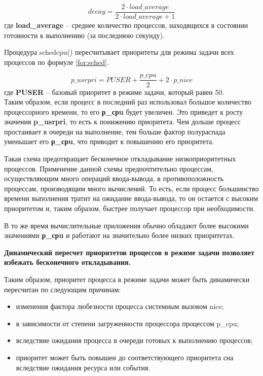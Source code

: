 \documentclass[a4paper,14pt,russian]{extreport}
\begin{document}
	\begin{equation}
		\label{for:bsd}
		decay = \frac{2 \cdot load\_average}{2 \cdot load\_average + 1}
	\end{equation}
	где \textbf{load\_average} -- среднее количество процессов, находящихся в состоянии готовности к выполнению (за последнюю секунду).
	
	Процедура schedcpu() пересчитывает приоритеты для режима задачи всех процессов по формуле \ref{for:sched}.
	
	\begin{equation}
		\label{for:sched}
		p\_usrpri = PUSER + \frac{p\_cpu}{2} + 2 \cdot p\_nice
	\end{equation}
	где \textbf{PUSER} -- базовый приоритет в режиме задачи, который равен 50.
	\\
	
	Таким образом, если процесс в последний раз использовал большое количество процессорного времени, то его \textbf{р\_срu} будет увеличен.
	Это приведет к росту значения \textbf{p\_usrpri}, то есть к понижению приоритета.
	Чем дольше процесс простаивает в очереди на выполнение, тем больше фактор полураспада уменьшает его \textbf{р\_срu}, что приводит к повышению его приоритета.
	
	Такая схема предотвращает бесконечное откладывание низкоприоритетных процессов.
	Применение данной схемы предпочтительно процессам, осуществляющим много операций ввода-вывода, в противоположность процессам, производящим много вычислений.
	То есть, если процесс большинство времени выполнения тратит на ожидание ввода-вывода, то он остается с высоким приоритетом и, таким образом, быстрее получает процессор при необходимости.
	
	В то же время вычислительные приложения обычно обладают более высокими значениями \textbf{р\_срu} и работают на значительно более низких приоритетах.
	
	\textbf{Динамический пересчет приоритетов процессов в режиме задачи позволяет избежать бесконечного откладывания.}
	
	Таким образом, приоритет процесса в режиме задачи может быть динамически пересчитан по следующим причинам:
	\begin{itemize}
		\item изменения фактора любезности процесса системным вызовом nice;
		\item в зависимости от степени загруженности процессора процессом p\_cpu;
		\item вследствие ожидания процесса в очереди готовых к выполнению процессов;
		\item приоритет может быть повышен до соответствующего приоритета сна вследствие ожидания ресурса или события.
	\end{itemize}
\end{document}
